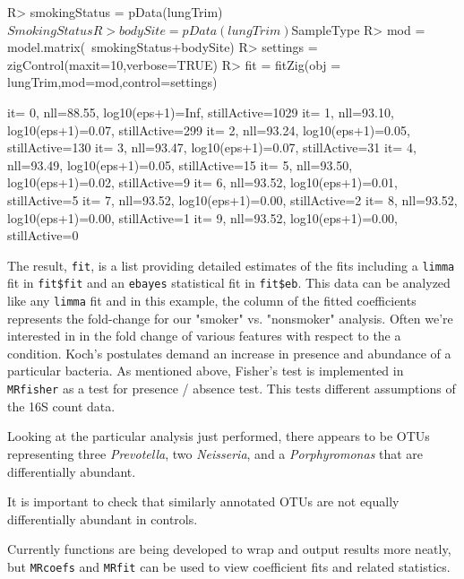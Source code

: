 \documentclass[a4paper,12pt]{article}
\begin{document}
\begin{small}
\begin{Schunk}
\begin{Sinput}
R> smokingStatus = pData(lungTrim)$SmokingStatus
R> bodySite = pData(lungTrim)$SampleType
R> mod = model.matrix(~smokingStatus+bodySite)
R> settings = zigControl(maxit=10,verbose=TRUE)
R> fit = fitZig(obj = lungTrim,mod=mod,control=settings)
\end{Sinput}
\begin{Soutput}
it= 0, nll=88.55, log10(eps+1)=Inf, stillActive=1029
it= 1, nll=93.10, log10(eps+1)=0.07, stillActive=299
it= 2, nll=93.24, log10(eps+1)=0.05, stillActive=130
it= 3, nll=93.47, log10(eps+1)=0.07, stillActive=31
it= 4, nll=93.49, log10(eps+1)=0.05, stillActive=15
it= 5, nll=93.50, log10(eps+1)=0.02, stillActive=9
it= 6, nll=93.52, log10(eps+1)=0.01, stillActive=5
it= 7, nll=93.52, log10(eps+1)=0.00, stillActive=2
it= 8, nll=93.52, log10(eps+1)=0.00, stillActive=1
it= 9, nll=93.52, log10(eps+1)=0.00, stillActive=0
\end{Soutput}
\end{Schunk}
\end{small}

The result, \texttt{fit}, is a list providing detailed estimates of the fits including a \texttt{limma} fit in \texttt{fit\$fit} and an \texttt{ebayes} statistical fit in \texttt{fit\$eb}. This data can be analyzed like any \texttt{limma} fit and in this example, the column of the fitted coefficients represents the fold-change for our "smoker" vs. "nonsmoker" analysis. 
Often we're interested in in the fold change of various features with respect to the a condition. Koch's postulates demand an increase in presence and abundance of a particular bacteria. As mentioned above, Fisher's test is implemented in \texttt{MRfisher} as a test for presence / absence test. This tests different assumptions of the 16S count data.

Looking at the particular analysis just performed, there appears to be OTUs representing three \textit{Prevotella}, two \textit{Neisseria}, and a \textit{Porphyromonas} that are differentially abundant.

It is important to check that similarly annotated OTUs are not equally differentially abundant in controls. 

Currently functions are being developed to wrap and output results more neatly, but \texttt{MRcoefs} and \texttt{MRfit} can be used to view coefficient fits and related statistics.
\end{document}
